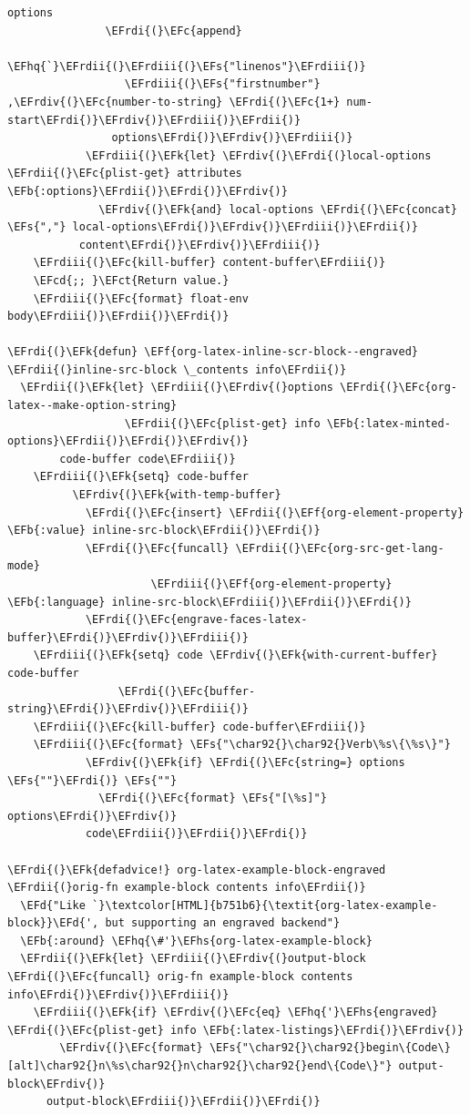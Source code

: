 \documentclass{scrartcl}
\newcommand{\EFk}[1]{\textcolor{EFk}{#1}} %
\newcommand{\EFd}[1]{\textcolor{EFd}{\textit{#1}}} %
\newcommand{\EFs}[1]{\textcolor{EFs}{#1}} %
\newcommand{\EFb}[1]{\textcolor{EFb}{#1}} %
\newcommand{\EFct}[1]{\textcolor{EFct}{#1}} %
\newcommand{\EFc}[1]{\textcolor{EFc}{#1}} %
\newcommand{\EFf}[1]{\textcolor{EFf}{#1}} %
\newcommand{\EFcd}[1]{\textcolor{EFcd}{#1}} %
\newcommand{\EFhq}[1]{\textcolor{EFhq}{#1}} %
\newcommand{\EFhs}[1]{\textcolor{EFhs}{#1}} %
\newcommand{\EFrdi}[1]{\textcolor{EFrdi}{#1}} %
\newcommand{\EFrdii}[1]{\textcolor{EFrdii}{#1}} %
\newcommand{\EFrdiii}[1]{\textcolor{EFrdiii}{#1}} %
\newcommand{\EFrdiv}[1]{\textcolor{EFrdiv}{#1}} %
\begin{document}
\begin{Code}
\begin{Verbatim}[]
                 options
               \EFrdi{(}\EFc{append}
                \EFhq{`}\EFrdii{(}\EFrdiii{(}\EFs{"linenos"}\EFrdiii{)}
                  \EFrdiii{(}\EFs{"firstnumber"} ,\EFrdiv{(}\EFc{number-to-string} \EFrdi{(}\EFc{1+} num-start\EFrdi{)}\EFrdiv{)}\EFrdiii{)}\EFrdii{)}
                options\EFrdi{)}\EFrdiv{)}\EFrdiii{)}
            \EFrdiii{(}\EFk{let} \EFrdiv{(}\EFrdi{(}local-options \EFrdii{(}\EFc{plist-get} attributes \EFb{:options}\EFrdii{)}\EFrdi{)}\EFrdiv{)}
              \EFrdiv{(}\EFk{and} local-options \EFrdi{(}\EFc{concat} \EFs{","} local-options\EFrdi{)}\EFrdiv{)}\EFrdiii{)}\EFrdii{)}
           content\EFrdi{)}\EFrdiv{)}\EFrdiii{)}
    \EFrdiii{(}\EFc{kill-buffer} content-buffer\EFrdiii{)}
    \EFcd{;; }\EFct{Return value.}
    \EFrdiii{(}\EFc{format} float-env body\EFrdiii{)}\EFrdii{)}\EFrdi{)}

\EFrdi{(}\EFk{defun} \EFf{org-latex-inline-scr-block--engraved} \EFrdii{(}inline-src-block \_contents info\EFrdii{)}
  \EFrdii{(}\EFk{let} \EFrdiii{(}\EFrdiv{(}options \EFrdi{(}\EFc{org-latex--make-option-string}
                  \EFrdii{(}\EFc{plist-get} info \EFb{:latex-minted-options}\EFrdii{)}\EFrdi{)}\EFrdiv{)}
        code-buffer code\EFrdiii{)}
    \EFrdiii{(}\EFk{setq} code-buffer
          \EFrdiv{(}\EFk{with-temp-buffer}
            \EFrdi{(}\EFc{insert} \EFrdii{(}\EFf{org-element-property} \EFb{:value} inline-src-block\EFrdii{)}\EFrdi{)}
            \EFrdi{(}\EFc{funcall} \EFrdii{(}\EFc{org-src-get-lang-mode}
                      \EFrdiii{(}\EFf{org-element-property} \EFb{:language} inline-src-block\EFrdiii{)}\EFrdii{)}\EFrdi{)}
            \EFrdi{(}\EFc{engrave-faces-latex-buffer}\EFrdi{)}\EFrdiv{)}\EFrdiii{)}
    \EFrdiii{(}\EFk{setq} code \EFrdiv{(}\EFk{with-current-buffer} code-buffer
                 \EFrdi{(}\EFc{buffer-string}\EFrdi{)}\EFrdiv{)}\EFrdiii{)}
    \EFrdiii{(}\EFc{kill-buffer} code-buffer\EFrdiii{)}
    \EFrdiii{(}\EFc{format} \EFs{"\char92{}\char92{}Verb\%s\{\%s\}"}
            \EFrdiv{(}\EFk{if} \EFrdi{(}\EFc{string=} options \EFs{""}\EFrdi{)} \EFs{""}
              \EFrdi{(}\EFc{format} \EFs{"[\%s]"} options\EFrdi{)}\EFrdiv{)}
            code\EFrdiii{)}\EFrdii{)}\EFrdi{)}

\EFrdi{(}\EFk{defadvice!} org-latex-example-block-engraved \EFrdii{(}orig-fn example-block contents info\EFrdii{)}
  \EFd{"Like `}\textcolor[HTML]{b751b6}{\textit{org-latex-example-block}}\EFd{', but supporting an engraved backend"}
  \EFb{:around} \EFhq{\#'}\EFhs{org-latex-example-block}
  \EFrdii{(}\EFk{let} \EFrdiii{(}\EFrdiv{(}output-block \EFrdi{(}\EFc{funcall} orig-fn example-block contents info\EFrdi{)}\EFrdiv{)}\EFrdiii{)}
    \EFrdiii{(}\EFk{if} \EFrdiv{(}\EFc{eq} \EFhq{'}\EFhs{engraved} \EFrdi{(}\EFc{plist-get} info \EFb{:latex-listings}\EFrdi{)}\EFrdiv{)}
        \EFrdiv{(}\EFc{format} \EFs{"\char92{}\char92{}begin\{Code\}[alt]\char92{}n\%s\char92{}n\char92{}\char92{}end\{Code\}"} output-block\EFrdiv{)}
      output-block\EFrdiii{)}\EFrdii{)}\EFrdi{)}
\end{Verbatim}
\end{Code}
\end{document}

